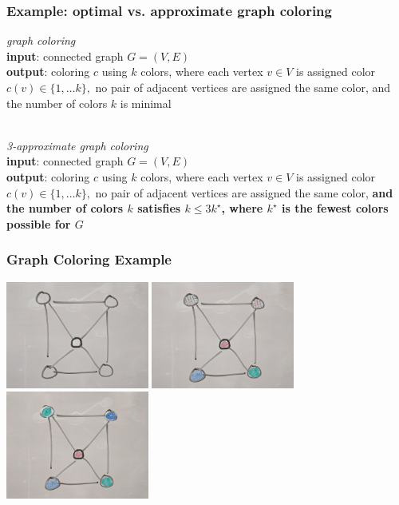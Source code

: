 \documentclass{beamer}
\newcommand{\stanza}{ \\~\ }
\begin{document}
\begin{frame} \frametitle{Example: optimal vs. approximate graph coloring}
\emph{graph coloring} \\
\textbf{input}: connected graph $G=(V,E)$ \\
\textbf{output}: coloring $c$ using $k$ colors, where each vertex $v \in V$ is assigned color
  $c(v) \in \{1, \ldots k\},$ no pair of adjacent vertices are assigned the
  same color, and the number of colors $k$ is minimal
\stanza

\emph{3-approximate graph coloring} \\
\textbf{input}: connected graph $G=(V,E)$ \\
\textbf{output}: coloring $c$ using $k$ colors, where each vertex $v \in V$ is assigned color
  $c(v) \in \{1, \ldots k\},$ no pair of adjacent vertices are assigned the
  same color, \textbf{and the number of colors $k$ satisfies $k \leq 3 k^\star$,
  where $k^\star$ is the fewest colors possible for $G$}
\end{frame}

\begin{frame} \frametitle{Graph Coloring Example}
  \begin{center}
    \includegraphics[height=100pt]{13-graph-uncolored.jpg}
    \includegraphics[height=100pt]{13-graph-colored-suboptimal.jpg}
    \includegraphics[height=100pt]{13-graph-colored-optimal.jpg}
  \end{center}
\end{frame}
\end{document}
